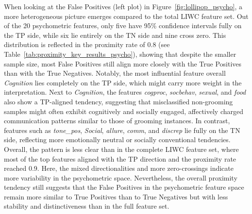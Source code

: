 When looking at the False Positives (left plot) in Figure~\ref{fig:lollipop_psycho}, a more heterogeneous picture emerges compared to the total LIWC feature set. Out of the 20 psychometric features, only five have 95\% confidence intervals fully on the TP side, while six lie entirely on the TN side and nine cross zero. This distribution is reflected in the proximity rate of 0.8 (see Table~\ref{tab:proximity_key_results_psycho}), showing that despite the smaller sample size, most False Positives still align more closely with the True Positives than with the True Negatives. Notably, the most influential feature overall \textit{Cognition} lies completely on the TP side, which might carry more weight in the interpretation. Next to \textit{Cognition}, the features \textit{cogproc}, \textit{socbehav}, \textit{sexual}, and \textit{food} also show a TP-aligned tendency, suggesting that misclassified non-grooming samples might often exhibit cognitively and socially engaged, affectively charged communication patterns similar to those of grooming instances. In contrast, features such as \textit{tone\_pos}, \textit{Social}, \textit{allure}, \textit{comm}, and \textit{discrep} lie fully on the TN side, reflecting more emotionally neutral or socially conventional tendencies. Overall, the pattern is less clear than in the complete LIWC feature set, where most of the top features aligned with the TP direction and the proximity rate reached 0.9. Here, the mixed directionalities and more zero-crossings indicate more variability in the psychometric space. Nevertheless, the overall proximity tendency still suggests that the False Positives in the psychometric feature space remain more similar to True Positives than to True Negatives but with less stability and distinctiveness than in the full feature set.


